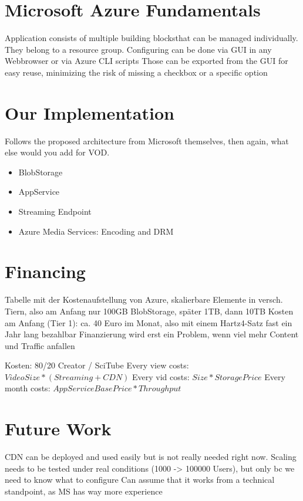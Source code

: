 \documentclass[english]{lni}
\begin{document}
\section{Microsoft Azure Fundamentals}
Application consists of multiple \glqq building blocks\grqq that can be managed individually.
They belong to a resource group.
Configuring can be done via GUI in any Webbrowser or via Azure CLI scripts
Those can be exported from the GUI for easy reuse, minimizing the risk of missing a checkbox or a specific option

\section{Our Implementation}
Follows the proposed architecture from Microsoft themselves, then again, what else would you add for VOD.
\begin{itemize}
    \item BlobStorage
    \item AppService
    \item Streaming Endpoint
    \item Azure Media Services: Encoding and DRM
\end{itemize}

\section{Financing}
Tabelle mit der Kostenaufstellung von Azure, skalierbare Elemente
in versch. Tiern, also am Anfang nur 100GB BlobStorage, später 1TB, dann 10TB
Kosten am Anfang (Tier 1): ca. 40 Euro im Monat, also mit einem Hartz4-Satz fast ein Jahr lang bezahlbar
Finanzierung wird erst ein Problem, wenn viel mehr Content und Traffic anfallen

Kosten: 80/20 Creator / SciTube
Every view costs: $VideoSize * (Streaming+CDN)$
Every vid costs: $Size * StoragePrice$
Every month costs: $AppServiceBasePrice * Throughput$

\section{Future Work}
CDN can be deployed and used easily but is not really needed right now. 
Scaling needs to be tested under real conditions (1000 -> 100000 Users), but only bc we need to know what to configure
Can assume that it works from a technical standpoint, as MS has way more experience
    
\end{document}
